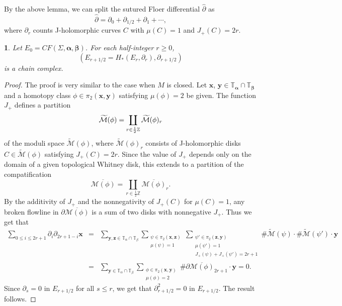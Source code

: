 \documentclass[11pt,oneside,english]{amsart}
\numberwithin{equation}{section}
\numberwithin{figure}{section}
\theoremstyle{definition}
\theoremstyle{plain}
\theoremstyle{plain}
\newtheorem{lem}[thm]{\protect\lemmaname}
\theoremstyle{remark}
\theoremstyle{plain}
\providecommand{\lemmaname}{Lemma}
\begin{document}
By the above lemma, we can split the sutured Floer differential $\widehat{\partial}$
as
\[
\widehat{\partial}=\partial_{0}+\partial_{1/2}+\partial_{1}+\cdots,
\]
 where $\partial_{r}$ counts J-holomorphic curves $C$ with $\mu(C)=1$
and $J_{+}(C)=2r$.
\begin{lem}
Let $E_{0}=CF(\Sigma,{\boldsymbol{\alpha}},{\boldsymbol{\beta}})$.
For each half-integer $r \ge 0$,
\[
\left(E_{r+1/2}=H_{\ast}(E_{r},\partial_{r}),\partial_{r+1/2}\right)
\]
is a chain complex. \end{lem}
\begin{proof}
The proof is very similar to the case when $M$ is closed.
Let $\mathbf{x}$, $\mathbf{y}\in\mathbb{T}_{\boldsymbol{\alpha}}\cap\mathbb{T}_{\boldsymbol{\beta}}$
and a homotopy class $\phi \in \pi_2(\mathbf{x},\mathbf{y})$
satisfying $\mu(\phi)=2$ be given. The function $J_{+}$ defines a partition
\[
\widetilde{\mathcal{M}}(\mbox{\ensuremath{\phi}})=\coprod_{r\in\frac{1}{2}\mathbb{Z}}\widetilde{\mathcal{M}}(\phi)_{r}
\]
of the moduli space $\widetilde{\mathcal{M}}(\phi)$, where $\widetilde{\mathcal{M}}(\phi)_{r}$ consists of J-holomorphic
disks $C\in\widetilde{\mathcal{M}}(\phi)$ satisfying $J_{+}(C) = 2r$.
Since the value of $J_+$ depends only on the domain of
a given topological Whitney disk, this extends to a partition of the compatification
\[
\overline{\mathcal{M}(\phi)}=\coprod_{r\in\frac{1}{2}\mathbb{Z}}\overline{\mathcal{M}(\phi)}_{r}.
\]
 By the additivity of $J_{+}$ and the nonnegativity of $J_{+}(C)$
for $\mu(C)=1$, any broken flowline in $\partial\overline{\mathcal{M}(\phi)}$
is a sum of two disks with nonnegative $J_{+}$. Thus we get that
\begin{eqnarray*}
\sum_{0\le i\le2r+1}\partial_{i}\partial_{2r+1-i}\mathbf{x} & = & \sum_{{\mathbf{y}},{\mathbf{z}} \in {\mathbb{T}}_{\alpha} \cap {\mathbb{T}}_{\beta}} \sum_{\substack{\psi \in \pi_2(\mathbf{x},\mathbf{z})\\
\mu(\psi)=1
}}\sum_{\substack{ \psi' \in \pi_2(\mathbf{z},\mathbf{y})\\
\mu(\psi')=1\\
J_{+}(\psi)+J_{+}(\psi') = 2r+1
}}\#\widetilde{\mathcal{M}}(\psi)\cdot\#\widetilde{\mathcal{M}}(\psi')\cdot\mathbf{y}\\
 & = &  \sum_{\mathbf{y} \in {\mathbb{T}}_{\alpha} \cap {\mathbb{T}}_{\beta}} \sum_{\substack{\phi \in \pi_2(\mathbf{x},\mathbf{y})\\
\mu(\phi)=2
}}\#\partial\overline{\mathcal{M}(\phi)}_{2r+1}\cdot\mathbf{y}=0.
\end{eqnarray*}
 Since $\partial_{s}=0$ in $E_{r+1/2}$ for all $s\le r$, we get that
$\partial_{r+1/2}^{2}=0$ in $E_{r+1/2}$. The result follows.
\end{proof}
\end{document}
